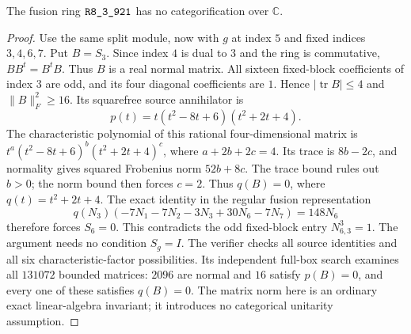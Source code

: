 \begin{theorem}
The fusion ring $\sha{R8_3_921}$ has no categorification over $\mathbb C$.
\end{theorem}
\begin{proof}
Use the same split module, now with $g$ at index $5$ and fixed indices
$3,4,6,7$.  Put $B=S_3$.  Since index $4$ is dual to $3$ and the ring
is commutative, $BB^t=B^tB$.  Thus $B$ is a real normal matrix.
All sixteen fixed-block coefficients of index $3$ are odd, and its four
diagonal coefficients are $1$.  Hence
$|\operatorname{tr}B|\leq4$ and $\|B\|_F^2\geq16$.
Its squarefree source annihilator is
\[
 p(t)=t(t^2-8t+6)(t^2+2t+4).
\]
The characteristic polynomial of this rational four-dimensional matrix
is $t^a(t^2-8t+6)^b(t^2+2t+4)^c$, where
$a+2b+2c=4$.  Its trace is $8b-2c$, and normality gives squared
Frobenius norm $52b+8c$.  The trace bound rules out $b>0$; the norm
bound then forces $c=2$.  Thus $q(B)=0$, where $q(t)=t^2+2t+4$.
The exact identity in the regular fusion representation
\[
 q(N_3)(-7N_1-7N_2-3N_3+30N_6-7N_7)=148N_6
\]
therefore forces $S_6=0$.  This contradicts the odd fixed-block entry
$N_{6,3}^{3}=1$.  The argument needs no condition $S_g=I$.
The verifier  checks all source
identities and all six characteristic-factor possibilities.  Its
independent full-box search examines all $131072$ bounded matrices:
$2096$ are normal and $16$ satisfy $p(B)=0$, and every one of these
satisfies $q(B)=0$.  The matrix norm here is an ordinary exact
linear-algebra invariant; it introduces no categorical unitarity
assumption.
\end{proof}

